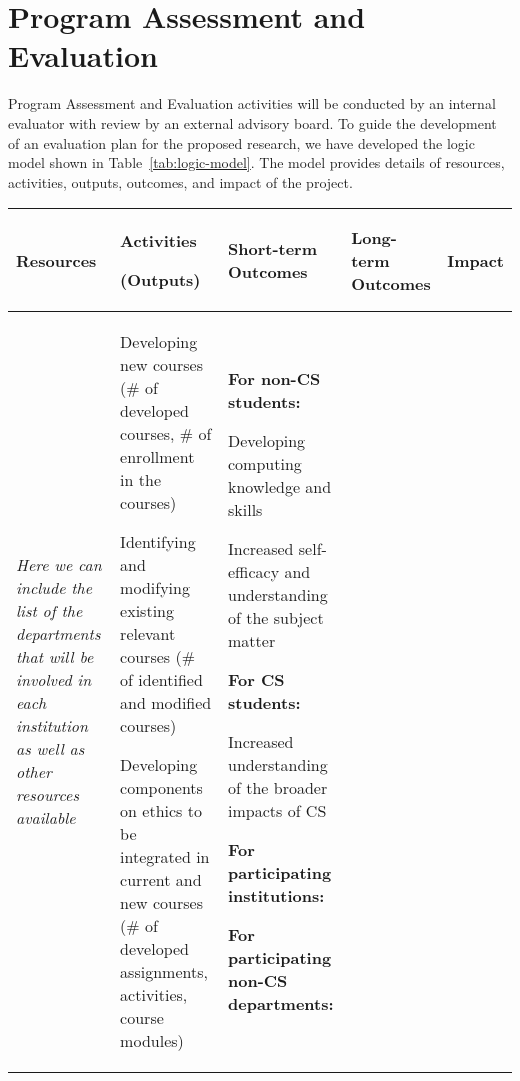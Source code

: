 \section{Program Assessment and Evaluation}
Program Assessment and Evaluation activities will be conducted by an internal evaluator with review by an external advisory board. 
To guide the development of an evaluation plan for the proposed research, we have developed the logic model shown in Table~\ref{tab:logic-model}. The model provides details of resources, activities, outputs, outcomes, and impact of the project.

\begin{table}[hp!]
\begin{tabular}{|p{1in}|p{1in}|p{1in}|p{1in}|p{1in}|}
    \hline
    \textbf{Resources}& \textbf{Activities}
    
   \textbf{(Outputs)} & \textbf{Short-term Outcomes} 
    & \textbf{Long-term Outcomes} &\textbf{Impact} \\
    \hline
    \textit{Here we can include the list of the departments that will be involved in each institution as well as other resources available }

    &
    Developing new courses (\# of developed courses, \# of enrollment in the courses)

    \vspace{0.25in}
    Identifying and modifying existing relevant courses (\# of identified and modified courses)

    \vspace{0.25in}
    Developing components on ethics to be integrated in current and new courses (\# of developed assignments, activities, course modules)

    & 
    \textbf{For non-CS students:}

    Developing computing knowledge and skills 

    Increased self-efficacy and understanding of the subject matter

    \vspace{0.25in}
    \textbf{For CS students:}
    
    Increased understanding of the broader impacts of CS

    \vspace{0.25in}
    \textbf{For participating institutions:}
    
    \vspace{0.25in}
    \textbf{For participating non-CS departments:}
    

\end{tabular}
\end{table}
